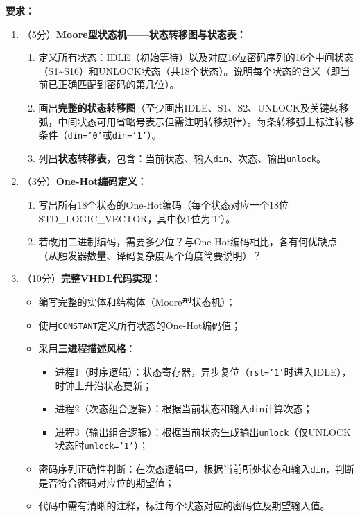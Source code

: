 \textbf{要求：}
\begin{enumerate}[label=(\arabic*)]
  \item （5分）\textbf{Moore型状态机——状态转移图与状态表：}
  \begin{enumerate}
    \item 定义所有状态：IDLE（初始等待）以及对应16位密码序列的16个中间状态（S1\~{}S16）和UNLOCK状态（共18个状态）。说明每个状态的含义（即当前已正确匹配到密码的第几位）。
    \item 画出\textbf{完整的状态转移图}（至少画出IDLE、S1、S2、UNLOCK及关键转移弧，中间状态可用省略号表示但需注明转移规律）。每条转移弧上标注转移条件（\texttt{din='0'}或\texttt{din='1'}）。
    \item 列出\textbf{状态转移表}，包含：当前状态、输入\texttt{din}、次态、输出\texttt{unlock}。
  \end{enumerate}

  \item （3分）\textbf{One-Hot编码定义：}
  \begin{enumerate}
    \item 写出所有18个状态的One-Hot编码（每个状态对应一个18位STD\_LOGIC\_VECTOR，其中仅1位为'1'）。
    \item 若改用二进制编码，需要多少位？与One-Hot编码相比，各有何优缺点（从触发器数量、译码复杂度两个角度简要说明）？
  \end{enumerate}

  \item （10分）\textbf{完整VHDL代码实现：}
  \begin{itemize}
    \item 编写完整的实体和结构体（Moore型状态机）；
    \item 使用\texttt{CONSTANT}定义所有状态的One-Hot编码值；
    \item 采用\textbf{三进程描述风格}：
    \begin{itemize}
      \item 进程1（时序逻辑）：状态寄存器，异步复位（\texttt{rst='1'}时进入IDLE），时钟上升沿状态更新；
      \item 进程2（次态组合逻辑）：根据当前状态和输入\texttt{din}计算次态；
      \item 进程3（输出组合逻辑）：根据当前状态生成输出\texttt{unlock}（仅UNLOCK状态时\texttt{unlock='1'}）；
    \end{itemize}
    \item 密码序列正确性判断：在次态逻辑中，根据当前所处状态和输入\texttt{din}，判断是否符合密码对应位的期望值；
    \item 代码中需有清晰的注释，标注每个状态对应的密码位及期望输入值。
  \end{itemize}


\end{enumerate}
